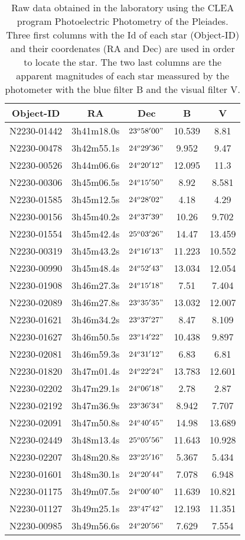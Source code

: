 \begin{table}[H]
	\centering
	\begin{tabular}{ c  c  c  c  c }
		\\\hline
		\centering
			Object-ID & RA & Dec & B & V \\\hline
			N2230-01442 & 3h41m18.0s & $23^o58'00"$ & 10.539 & 8.81 \\
			N2230-00478 & 3h42m55.1s & $24^o29'36"$ & 9.952 & 9.47 \\
			N2230-00526 & 3h44m06.6s & $24^o20'12"$ & 12.095 & 11.3 \\
			N2230-00306 & 3h45m06.5s & $24^o15'50"$ & 8.92 & 8.581 \\
			N2230-01585 & 3h45m12.5s & $24^o28'02"$ & 4.18 & 4.29 \\
			N2230-00156 & 3h45m40.2s & $24^o37'39"$ & 10.26 & 9.702 \\
			N2230-01554 & 3h45m42.4s & $25^o03'26"$ & 14.47 & 13.459 \\
			N2230-00319 & 3h45m43.2s & $24^o16'13"$ & 11.223 & 10.552 \\
			N2230-00990 & 3h45m48.4s & $24^o52'43"$ & 13.034 & 12.054 \\
			N2230-01908 & 3h46m27.3s & $24^o15'18"$ & 7.51 & 7.404 \\
			N2230-02089 & 3h46m27.8s & $23^o35'35"$ & 13.032 & 12.007 \\
			N2230-01621 & 3h46m34.2s & $23^o37'27"$ & 8.47 & 8.109 \\
			N2230-01627 & 3h46m50.5s & $23^o14'22"$ & 10.438 & 9.897 \\
			N2230-02081 & 3h46m59.3s & $24^o31'12"$ & 6.83 & 6.81 \\
			N2230-01820 & 3h47m01.4s & $24^o22'24"$ & 13.783 & 12.601 \\
			N2230-02202 & 3h47m29.1s & $24^o06'18"$ & 2.78 & 2.87 \\
			N2230-02192 & 3h47m36.9s & $23^o36'34"$ & 8.942 & 7.707 \\
			N2230-02091 & 3h47m50.8s & $24^o40'45"$ & 14.98 & 13.689 \\
			N2230-02449 & 3h48m13.4s & $25^o05'56"$ & 11.643 & 10.928 \\
			N2230-02207 & 3h48m20.8s & $23^o25'16"$ & 5.367 & 5.434 \\
			N2230-01601 & 3h48m30.1s & $24^o20'44"$ & 7.078 & 6.948 \\
			N2230-01175 & 3h49m07.5s & $24^o00'40"$ & 11.639 & 10.821 \\
			N2230-01127 & 3h49m25.1s & $23^o47'42"$ & 12.193 & 11.351 \\
			N2230-00985 & 3h49m56.6s & $24^o20'56"$ & 7.629 & 7.554 \\\hline
	\end{tabular}
	\caption{\label{Tab:RawData}Raw data obtained in the laboratory using the CLEA program Photoelectric Photometry of the Pleiades. Three first columns with the Id of each star ({\normalfont Object-ID}) and their coordenates ({\normalfont RA} and {\normalfont Dec}) are used in order to locate the star. The two last columns are the apparent magnitudes of each star meassured by the photometer with the blue filter {\normalfont B} and the visual filter {\normalfont V}.}
\end{table}
